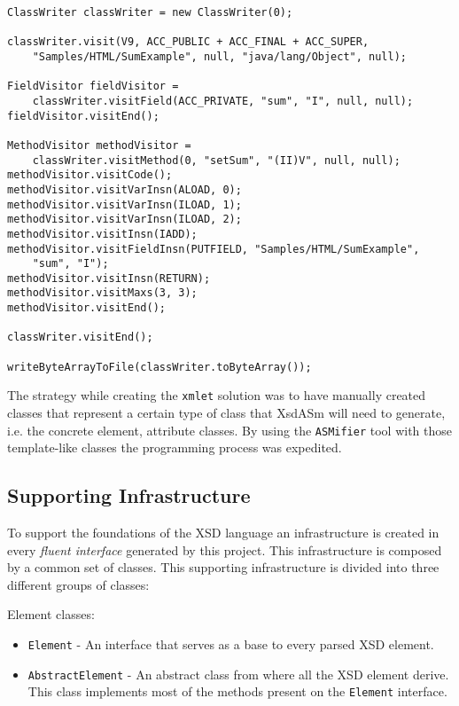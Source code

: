 \begin{minipage}{\linewidth}
\begin{lstlisting}[caption={ASM Example - Required Code},captionpos=b,label={lst:asmexamplecode}]
ClassWriter classWriter = new ClassWriter(0);

classWriter.visit(V9, ACC_PUBLIC + ACC_FINAL + ACC_SUPER, 
	"Samples/HTML/SumExample", null, "java/lang/Object", null);

FieldVisitor fieldVisitor = 
	classWriter.visitField(ACC_PRIVATE, "sum", "I", null, null);
fieldVisitor.visitEnd();

MethodVisitor methodVisitor = 
	classWriter.visitMethod(0, "setSum", "(II)V", null, null);
methodVisitor.visitCode();
methodVisitor.visitVarInsn(ALOAD, 0);
methodVisitor.visitVarInsn(ILOAD, 1);
methodVisitor.visitVarInsn(ILOAD, 2);
methodVisitor.visitInsn(IADD);
methodVisitor.visitFieldInsn(PUTFIELD, "Samples/HTML/SumExample",
	"sum", "I");
methodVisitor.visitInsn(RETURN);
methodVisitor.visitMaxs(3, 3);
methodVisitor.visitEnd();

classWriter.visitEnd();

writeByteArrayToFile(classWriter.toByteArray());
\end{lstlisting}
\end{minipage}

\noindent
The strategy while creating the \texttt{xmlet} solution was to have manually created classes that represent a certain type of class that XsdASm will need to generate, i.e. the concrete element, attribute classes. By using the \texttt{ASMifier} tool with those template-like classes the programming process was expedited.

\subsection{Supporting Infrastructure}
\label{sec:supportinginfrastructure}

To support the foundations of the \ac{XSD} language an infrastructure is created in every \textit{fluent interface} generated by this project. This infrastructure is composed by a common set of classes. This supporting infrastructure is divided into three different groups of classes:

Element classes:

\begin{itemize}  
	\item \texttt{Element} - An interface that serves as a base to every parsed \ac{XSD} element.
	\item \texttt{AbstractElement} - An abstract class from where all the \ac{XSD} element derive. This class implements most of the methods present on the \texttt{Element} interface.
\end{itemize}

